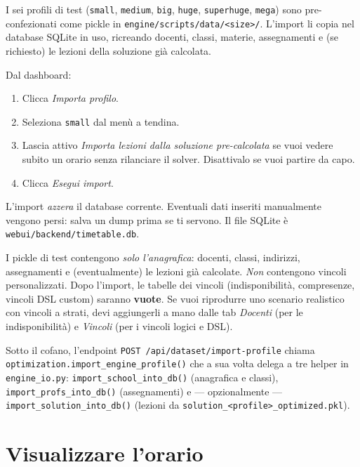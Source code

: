 I sei profili di test (\texttt{small}, \texttt{medium},
\texttt{big}, \texttt{huge}, \texttt{superhuge}, \texttt{mega})
sono pre-confezionati come pickle in
\texttt{engine/scripts/data/<size>/}. L'import li copia
nel database SQLite in uso, ricreando docenti, classi, materie,
assegnamenti e (se richiesto) le lezioni della soluzione
gi\`a calcolata.

Dal dashboard:

\begin{enumerate}
\item Clicca \emph{Importa profilo}.
\item Seleziona \texttt{small} dal men\`u a tendina.
\item Lascia attivo \emph{Importa lezioni dalla soluzione
  pre-calcolata} se vuoi vedere subito un orario senza
  rilanciare il solver. Disattivalo se vuoi partire da capo.
\item Clicca \emph{Esegui import}.
\end{enumerate}

\begin{avvertenzabox}
L'import \emph{azzera} il database corrente. Eventuali dati
inseriti manualmente vengono persi: salva un dump prima se ti
servono. Il file SQLite \`e
\texttt{webui/backend/timetable.db}.

I pickle di test contengono \emph{solo l'anagrafica}:
docenti, classi, indirizzi, assegnamenti e (eventualmente) le
lezioni gi\`a calcolate. \emph{Non} contengono vincoli
personalizzati. Dopo l'import, le tabelle dei vincoli
(indisponibilit\`a, compresenze, vincoli DSL custom) saranno
\textbf{vuote}. Se vuoi riprodurre uno scenario realistico
con vincoli a strati, devi aggiungerli a mano dalle tab
\emph{Docenti} (per le indisponibilit\`a) e \emph{Vincoli}
(per i vincoli logici e DSL).
\end{avvertenzabox}

\begin{biblioparvabox}
\sffamily
Sotto il cofano, l'endpoint
\texttt{POST /api/dataset/import-profile} chiama
\texttt{optimization.import\_engine\_profile()} che a sua volta
delega a tre helper in \texttt{engine\_io.py}:
\texttt{import\_school\_into\_db()} (anagrafica e classi),
\texttt{import\_profs\_into\_db()} (assegnamenti) e ---
opzionalmente ---
\texttt{import\_solution\_into\_db()} (lezioni da
\texttt{solution\_<profile>\_optimized.pkl}).
\end{biblioparvabox}

\section{Visualizzare l'orario}


